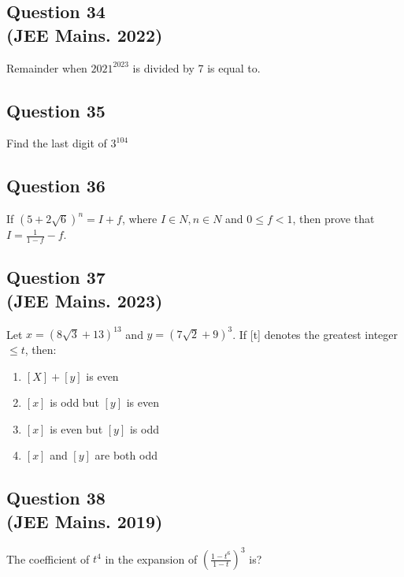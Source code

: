 \subsection*{Question 34 \\ \small(JEE Mains. 2022)}
Remainder when $2021^{2023}$ is divided by 7 is equal to.

\subsection*{Question 35}
Find the last digit of $3^{104}$

\subsection*{Question 36}
If $(5+2\sqrt{6})^n = I+f$, where $I \in N, n \in N$ and $0 \leq f< 1$, then prove that $I=\frac{1}{1-f}-f$.

\subsection*{Question 37 \\ \small(JEE Mains. 2023)}
Let $x = (8\sqrt{3}+13)^{13}$ and $y = (7\sqrt{2}+9)^3$. If [t] denotes the greatest integer $\leq t$, then: 
\begin{enumerate}
    \item $[X]+[y]$ is even
    \item $[x]$ is odd but $[y]$ is even
    \item $[x]$ is even but $[y]$ is odd
    \item $[x]$ and $[y]$ are both odd
\end{enumerate}
\subsection*{Question 38 \\ \small(JEE Mains. 2019)}
The coefficient of $t^4$ in the expansion of $\left( \frac{1-t^6}{1-t} \right)^3$ is?